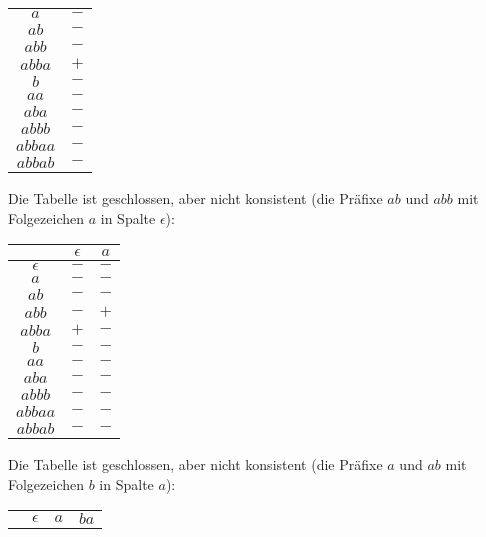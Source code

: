 \documentclass[11pt,a4paper]{article}
\begin{document}
\begin{loesung}
\begin{enumerate}
\begin{table}[h!]
\begin{tabular}{c|c}
                $a$ & $-$ \\
                $ab$ & $-$ \\
                $abb$ & $-$ \\
                $abba$ & $+$ \\
                \hline
                $b$ & $-$ \\
                $aa$ & $-$ \\
                $aba$ & $-$ \\
                $abbb$ & $-$ \\
                $abbaa$ & $-$ \\
                $abbab$ & $-$ \\
            \end{tabular}
        \end{table}
        \FloatBarrier
        Die Tabelle ist geschlossen, aber nicht konsistent (die Präfixe $ab$ und $abb$ mit Folgezeichen $a$ in Spalte $\epsilon$):
        \begin{table}[h!]
            \centering
            \begin{tabular}{c|cc}
                & $\epsilon$ & $a$ \\
                \hline
                $\epsilon$ & $-$ & $-$ \\
                $a$ & $-$ & $-$ \\
                $ab$ & $-$ & $-$ \\
                $abb$ & $-$ & $+$ \\
                $abba$ & $+$ & $-$ \\
                \hline
                $b$ & $-$ & $-$ \\
                $aa$ & $-$ & $-$ \\
                $aba$ & $-$ & $-$ \\
                $abbb$ & $-$ & $-$ \\
                $abbaa$ & $-$ & $-$ \\
                $abbab$ & $-$ & $-$ \\
            \end{tabular}
        \end{table}
        \FloatBarrier
        Die Tabelle ist geschlossen, aber nicht konsistent (die Präfixe $a$ und $ab$ mit Folgezeichen $b$ in Spalte $a$):
        \begin{table}[h!]
            \centering
            \begin{tabular}{c|ccc}
                & $\epsilon$ & $a$ & $ba$ \\

\end{tabular}
\end{table}
\end{enumerate}
\end{loesung}
\end{document}
